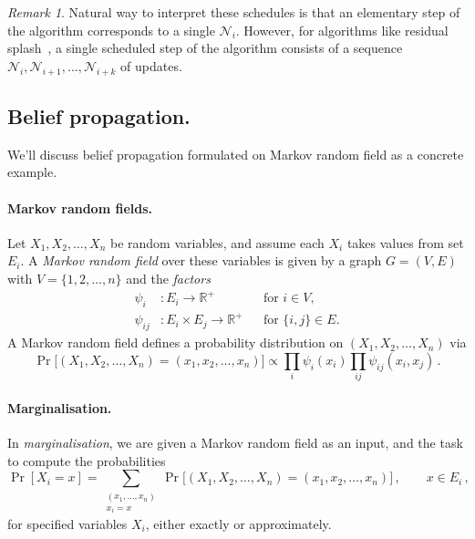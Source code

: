 \documentclass[11pt,a4paper]{article}
\theoremstyle{remark}
\newtheorem{remark}[theorem]{Remark}
\newcommand{\Reals}{\mathbb{R}}
\newcommand{\N}{\mathcal{N}}
\newcommand{\range}{E}
\begin{document}
\begin{remark}
Natural way to interpret these schedules is that an elementary step of the algorithm corresponds to a single $\N_i$. However, for algorithms like residual splash~\cite{pmlr-v5-gonzalez09a}, a single scheduled step of the algorithm consists of a sequence $\N_i, \N_{i+1}, \dotsc, \N_{i+k}$ of updates.
\end{remark}

\subsection{Belief propagation.}

We'll discuss belief propagation formulated on Markov random field as a concrete example.

\paragraph{Markov random fields.} Let $X_1, X_2, \dotsc, X_n$ be random variables, and assume each $X_i$ takes values from set $\range_i$. A \emph{Markov random field} over these variables is given by a graph $G = (V,E)$ with $V = \{ 1, 2, \dotsc, n \}$ and the \emph{factors}
\begin{align}
    \psi_{i} & \colon \range_i \to \Reals^+ && \text{for $i \in V$,}\\
    \psi_{ij} & \colon \range_i \times \range_j \to \Reals^+ && \text{for $\{i, j\} \in E$.}
\end{align}
A Markov random field defines a probability distribution on $(X_1, X_2, \dotsc, X_n)$ via
\[ \Pr\bigl[ (X_1, X_2, \dotsc, X_n) = (x_1, x_2, \dotsc, x_n) \bigr] \propto \prod_{i} \psi_i(x_i) \prod_{ij} \psi_{ij}(x_i, x_j) \,.\]

\paragraph{Marginalisation.} In \emph{marginalisation}, we are given a Markov random field as an input, and the task to compute the probabilities
\[ \Pr[ X_i = x ] = \sum_{\substack{ (x_1,\dotsc, x_n) \\ x_i = x}} \Pr\bigl[ (X_1, X_2, \dotsc, X_n) = (x_1, x_2, \dotsc, x_n)\bigr]\,, \qquad x \in \range_i\,,\]
for specified variables $X_i$, either exactly or approximately.
\end{document}
